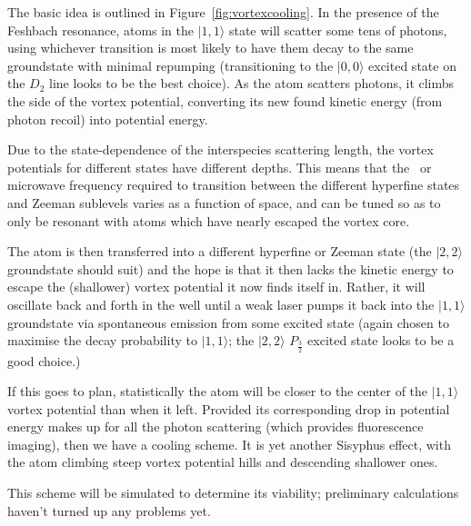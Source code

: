 The basic idea is outlined in Figure~\ref{fig:vortexcooling}. In the presence of the Feshbach resonance, atoms in the $|1,1\rangle$ state will scatter some tens of photons, using whichever transition is most likely to have them decay to the same groundstate with minimal repumping (transitioning to the $|0,0\rangle$ excited state on the $D_2$ line looks to be the best choice). As the atom scatters photons, it climbs the side of the vortex potential, converting its new found kinetic energy (from photon recoil) into potential energy.

Due to the state-dependence of the interspecies scattering length, the vortex potentials for different states have different depths. This means that the \rf\ or microwave frequency required to transition between the different hyperfine states and Zeeman sublevels varies as a function of space, and can be tuned so as to only be resonant with atoms which have nearly escaped the vortex core.

The atom is then transferred into a different hyperfine or Zeeman state (the $|2,2\rangle$ groundstate should suit) and the hope is that it then lacks the kinetic energy to escape the (shallower) vortex potential it now finds itself in. Rather, it will oscillate back and forth in the well until a weak laser pumps it back into the $|1,1\rangle$ groundstate via spontaneous emission from some excited state (again chosen to maximise the decay probability to $|1,1\rangle$; the $|2,2\rangle$ $P_\frac32$ excited state looks to be a good choice.)

If this goes to plan, statistically the atom will be closer to the center of the  $|1,1\rangle$ vortex potential than when it left. Provided its corresponding drop in potential energy makes up for all the photon scattering (which provides fluorescence imaging), then we have a cooling scheme. It is yet another Sisyphus effect, with the atom climbing steep vortex potential hills and descending shallower ones.

This scheme will be simulated to determine its viability; preliminary calculations haven't turned up any problems yet.


